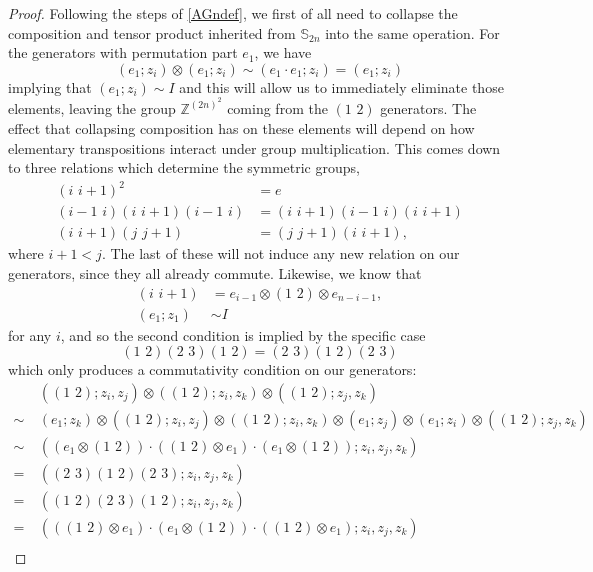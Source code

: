 \documentclass{amsbook} %
\newcommand{\trans}[2]{( #1 \, \, #2 )}
\numberwithin{section}{chapter}
\begin{document}
\begin{proof}
Following the steps of \cref{AGndef}, we first of all need to collapse the composition and tensor product inherited from $\mathbb{S}_{2n}$ into the same operation. For the generators with permutation part $e_1$, we have
  \[
    (e_1; z_i) \otimes (e_1; z_i) \sim (e_1 \cdot e_1; z_i) = (e_1; z_i)
  \]
implying that $(e_1; z_i) \sim I$ and this will allow us to immediately eliminate those elements, leaving the group $\mathbb{Z}^{(2n)^2}$ coming from the $\trans{1}{2}$ generators. The effect that collapsing composition has on these elements will depend on how elementary transpositions interact under group multiplication. This comes down to three relations which determine the symmetric groups,
  \begin{align*}
		\trans{i}{i+1}^2 &= e \\
    \trans{i-1}{i}\trans{i}{i+1}\trans{i-1}{i} &= \trans{i}{i+1}\trans{i-1}{i}\trans{i}{i+1}\\
    \trans{i}{i+1}\trans{j}{j+1} &= \trans{j}{j+1}\trans{i}{i+1},
  \end{align*}
where $i+1 < j$.
The last of these will not induce any new relation on our generators, since they all already commute. Likewise, we know that 
  \begin{align*}
    \trans{i}{i+1} &=  e_{i-1} \otimes \trans{1}{2} \otimes e_{n-i-1}, \\
    (e_1; z_1) &\sim  I
  \end{align*}
for any $i$, and so the second condition is implied by the specific case
  \[
    \trans{1}{2}\trans{2}{3}\trans{1}{2} = \trans{2}{3}\trans{1}{2}\trans{2}{3}
  \]
which only produces a commutativity condition on our generators:
  \begin{align*}
    & (\trans{1}{2};z_i,z_j) \otimes (\trans{1}{2};z_i,z_k) \otimes (\trans{1}{2};z_j,z_k) \\
    \sim~&(e_1;z_k) \otimes (\trans{1}{2};z_i,z_j) \otimes (\trans{1}{2};z_i,z_k) \otimes (e_1;z_j) \otimes (e_1;z_i) \otimes (\trans{1}{2};z_j,z_k) \\
    \sim~&((e_1 \otimes \trans{1}{2}) \cdot (\trans{1}{2} \otimes e_1) \cdot (e_1 \otimes \trans{1}{2});z_i,z_j,z_k) \\
    =~&(\trans{2}{3}\trans{1}{2}\trans{2}{3};z_i,z_j,z_k) \\
    =~&(\trans{1}{2}\trans{2}{3}\trans{1}{2};z_i,z_j,z_k) \\
    =~&((\trans{1}{2} \otimes e_1) \cdot (e_1 \otimes \trans{1}{2}) \cdot (\trans{1}{2} \otimes e_1);z_i,z_j,z_k) \\

\end{align*}
\end{proof}
\end{document}
